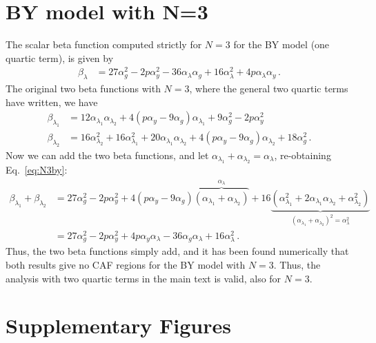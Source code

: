 \section{BY model with N=3}\label{app:BYN3}
The scalar beta function computed strictly for $N=3$ for the BY model (one quartic term), is given by
\begin{align}
    \beta_\lambda &= 27\alpha_g^2 - 2p\alpha_y^2 - 36\alpha_\lambda\alpha_g + 16\alpha_\lambda^2 + 4p\alpha_\lambda\alpha_y \,.\label{eq:N3by}
\end{align}
The original two beta functions with $N=3$, where the general two quartic terms have written, we have 
\begin{align}
\beta_{\lambda_1} &= 12\alpha_{\lambda_1}\alpha_{\lambda_2} + 4(p\alpha_y - 9\alpha_g)\alpha_{\lambda_1} + 9\alpha_g^2 - 2p\alpha_y^2 \\
\beta_{\lambda_2} &= 16\alpha_{\lambda_2}^2 + 16\alpha_{\lambda_1}^2 + 20\alpha_{\lambda_1}\alpha_{\lambda_2} + 4(p\alpha_y - 9\alpha_g)\alpha_{\lambda_2} + 18\alpha_g^2 \,.
\end{align}
Now we can add the two beta functions, and let $\alpha_{\lambda_1}+\alpha_{\lambda_2}=\alpha_{\lambda}$, re-obtaining Eq.~\eqref{eq:N3by}:
\begin{align}
    \beta_{\lambda_1} + \beta_{\lambda_2} &= 27\alpha_g^2 - 2p\alpha_y^2  +4(p\alpha_y - 9\alpha_g)\overbrace{(\alpha_{\lambda_1} + \alpha_{\lambda_2})}^{\alpha_\lambda}  + 16\underbrace{(\alpha_{\lambda_1}^2 + 2\alpha_{\lambda_1}\alpha_{\lambda_2} + \alpha_{\lambda_2}^2)}_{(\alpha_{\lambda_1} + \alpha_{\lambda_2})^2=\alpha_\lambda^2}\nonumber \\
    &= 27\alpha_g^2 - 2p\alpha_y^2 + 4p\alpha_y\alpha_\lambda - 36\alpha_g\alpha_\lambda + 16\alpha_\lambda^2\,.
\end{align}
Thus, the two beta functions simply add, and it has been found numerically that both results give no CAF regions for the BY model with $N=3$. Thus, the analysis with two quartic terms in the main text is valid, also for $N=3$. 


\section{Supplementary Figures}
